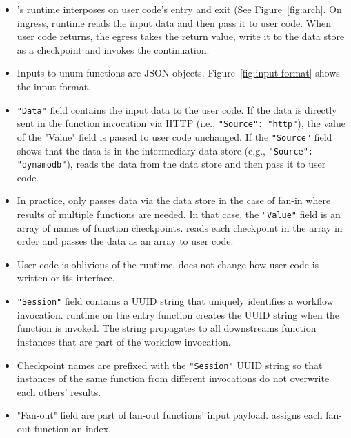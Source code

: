 \begin{itemize}

	\item \name{}'s runtime interposes on user code's entry and exit (See
	Figure~\ref{fig:arch}. On ingress, \name{} runtime reads the input data
	and then pass it to user code. When user code returns, the egress takes
	the return value, write it to the data store as a checkpoint and invokes
	the continuation.

	\item Inputs to unum functions are JSON objects.
	Figure~\ref{fig:input-format} shows the input format.

	\item \texttt{"Data"} field contains the input data to the user code. If
	the data is directly sent in the function invocation via HTTP (i.e.,
	\texttt{"Source": "http"}), the value of the "Value" field is passed to
	user code unchanged. If the \texttt{"Source"} field shows that the data is
	in the intermediary data store (e.g., \texttt{"Source": "dynamodb"}),
	\name{} reads the data from the data store and then pass it to user code.

	\item In practice, \name{} only passes data via the data store in the case
	of fan-in where results of multiple functions are needed. In that case,
	the \texttt{"Value"} field is an array of names of function checkpoints.
	\name{} reads each checkpoint in the array in order and passes the data as
	an array to user code.

	\item User code is oblivious of the \name{} runtime. \name{} does not
	change how user code is written or its interface.

	\item \texttt{"Session"} field contains a UUID string that uniquely
	identifies a workflow invocation. \name{} runtime on the entry function
	creates the UUID string when the function is invoked. The string
	propagates to all downstreams function instances that are part of the
	workflow invocation.

	\item Checkpoint names are prefixed with the \texttt{"Session"} UUID
	string so that instances of the same function from different invocations
	do not overwrite each others' results.

	\item "Fan-out" field are part of fan-out functions' input payload.
	\name{} assigns each fan-out function an index.


\end{itemize}

